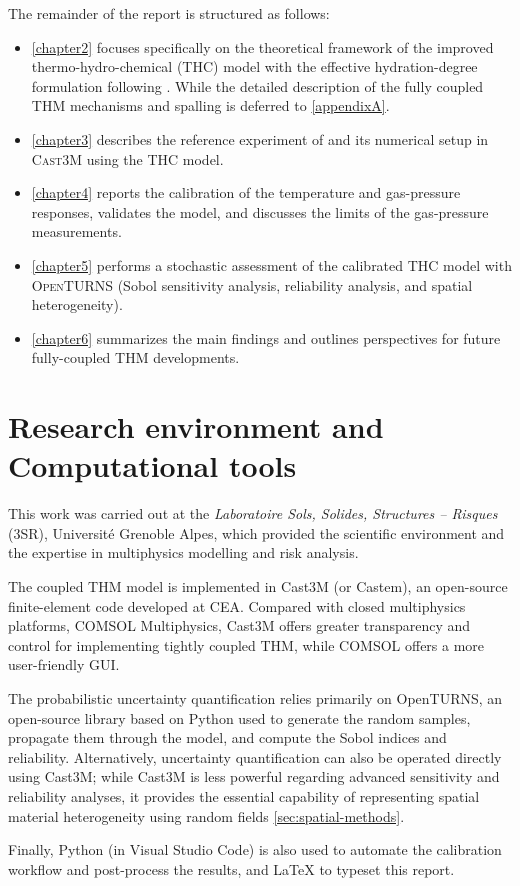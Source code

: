 The remainder of the report is structured as follows:
\begin{itemize}
  \item \cref{chapter2} focuses specifically on the theoretical framework of the improved thermo-hydro-chemical (THC) model with the effective hydration-degree formulation following \cite{sciume2024}. While the detailed description of the fully coupled THM mechanisms and spalling is deferred to \cref{appendixA}.
  \item \cref{chapter3} describes the reference experiment of \cite{kalifa2000} and its numerical setup in \textsc{Cast3M} using the THC model.
  \item \cref{chapter4} reports the calibration of the temperature and gas-pressure responses, validates the model, and discusses the limits of the gas-pressure measurements.
  \item \cref{chapter5} performs a stochastic assessment of the calibrated THC model with \textsc{OpenTURNS} (Sobol sensitivity analysis, reliability analysis, and spatial heterogeneity).
  \item \cref{chapter6} summarizes the main findings and outlines perspectives for future fully-coupled THM developments.
\end{itemize}

\section{Research environment and Computational tools}

This work was carried out at the \emph{Laboratoire Sols, Solides, Structures -- Risques} (3SR), Universit\'e Grenoble Alpes, which provided the scientific environment and the expertise in multiphysics modelling and risk analysis.
 
The coupled THM model is implemented in Cast3M (or Castem), an open-source finite-element code developed at CEA. Compared with closed multiphysics platforms, COMSOL Multiphysics, Cast3M offers greater transparency and control for implementing tightly coupled THM, while COMSOL offers a more user-friendly GUI. 

The probabilistic uncertainty quantification relies primarily on OpenTURNS, an open-source library based on Python used to generate the random samples, propagate them through the model, and compute the Sobol indices and reliability. Alternatively, uncertainty quantification can also be operated directly using Cast3M; while Cast3M is less powerful regarding advanced sensitivity and reliability analyses, it provides the essential capability of representing spatial material heterogeneity using random fields \cref{sec:spatial-methods}.

Finally, Python (in Visual Studio Code) is also used to automate the calibration workflow and post-process the results, and LaTeX to typeset this report.

